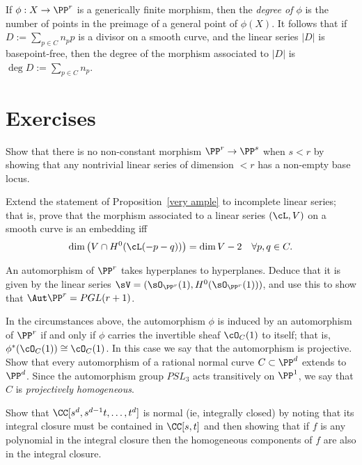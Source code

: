 If $\phi:X \to \PP^r$ is a generically finite morphism, then the \emph{degree of $\phi$} is the number of points in the preimage of a general point of $\phi(X)$. It follows that if $D := \sum_{p\in C} n_pp$ is a divisor on a smooth curve, and the linear series $|D|$ is basepoint-free, then the degree of the morphism associated to $|D|$ is $\deg D := \sum_{p\in C} n_p$.

\section{Exercises}

\begin{exercise}\label{here there be basepoints}
 Show that there is no non-constant morphism $\PP^r\to \PP^s$ when $s<r$ by showing that any nontrivial linear
 series of dimension $<r$ has a non-empty base locus.
\end{exercise}

\begin{exercise}
Extend the statement of Proposition~\ref{very ample} to incomplete linear series; that is, prove that the morphism associated to a linear series $(\cL, V)$
on a smooth curve is an embedding iff
$$
\dim\big( V \cap H^0(\cL(-p-q))\big) = \dim V - 2 \quad \forall p, q \in C.
$$
\end{exercise}

\begin{exercise}
An automorphism of $\PP^r$ takes hyperplanes to hyperplanes. Deduce that it is given by the linear series
$\sV = (\sO_{\PP^r}(1), H^0(\sO_{\PP^r}(1)))$, and use this to show that $\Aut \PP^r = PGL(r+1)$. 
\end{exercise}

\begin{exercise}\label{projective automorphism}
In the circumstances above, the automorphism $\phi$ is induced by an automorphism of $\PP^r$ if and only if $\phi$ carries the invertible sheaf $\cO_{C}(1)$ to itself; that is, $\phi^*(\cO_{C}(1)) \cong \cO_{C}(1)$. In this case we say that the automorphism
is projective. Show that every automorphism of a rational normal curve $C \subset \PP^d$  extends to $\PP^d$. Since the
automorphism group $PSL_3$ acts transitively on $\PP^1$, we say that
$C$ is \emph{projectively homogeneous}.


\end{exercise}

\begin{exercise}\label{normality of RNC}
 Show that $\CC[s^d,s^{d-1}t,\dots, t^d]$ is normal (ie, integrally closed) by noting that its integral closure must be
 contained in $\CC[s,t]$ and then showing that if $f$ is any polynomial
 in the integral closure then the homogeneous components of $f$ are also in the integral closure.
\end{exercise}



